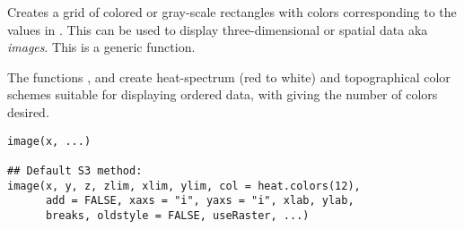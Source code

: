%
\begin{Description}\relax
Creates a grid of colored or gray-scale rectangles with colors
corresponding to the values in .  This can be used to display
three-dimensional or spatial data aka \emph{images}.
This is a generic function.

The functions , 
and  create heat-spectrum (red to white) and
topographical color schemes suitable for displaying ordered data, with
 giving the number of colors desired.
\end{Description}
%
\begin{Usage}
\begin{verbatim}
image(x, ...)

## Default S3 method:
image(x, y, z, zlim, xlim, ylim, col = heat.colors(12),
      add = FALSE, xaxs = "i", yaxs = "i", xlab, ylab,
      breaks, oldstyle = FALSE, useRaster, ...)
\end{verbatim}
\end{Usage}
%
